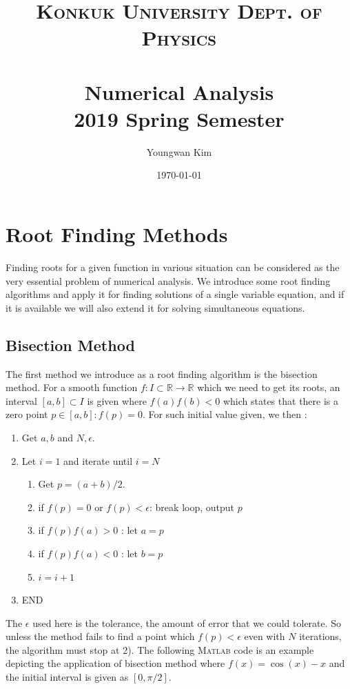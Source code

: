 \documentclass[paper=a4, fontsize=11pt]{scrartcl}
\title{	
	\normalfont \normalsize 
	\textsc{Konkuk University Dept. of Physics} \\ [25pt] %
	\horrule{1pt} \\[0.4cm] 
	\huge Numerical Analysis \\
	\vspace{0.1in}
	\Large 2019 Spring Semester
	\horrule{1pt} \\[0.4cm] 
}
\author{Youngwan Kim}
\date{\normalsize\today}
\newcommand{\MATLAB}{\textsc{Matlab}\xspace}
\begin{document}
	
\maketitle	

\vspace{0.25in}

\section{Root Finding Methods}
\vspace{0.25in}
Finding roots for a given function in various situation can be considered as the very essential problem of numerical analysis. We introduce some root finding algorithms and apply it for finding solutions of a single variable equation, and if it is available we will also extend it for solving simultaneous equations. \\ 

\subsection{Bisection Method}
\vspace{0.15in}
The first method we introduce as a root finding algorithm is the bisection method. For a smooth function $f:I\subset\mathbb{R}\to \mathbb{R}$ which we need to get its roots, an interval $[a,b]\subset I$ is given where $f(a)f(b)<0$ which states that there is a zero point $p\in [a,b] : f(p) =0$. For such initial value given, we then :

\begin{enumerate}[label=\arabic*)]
	\item Get $a,b$ and $N,\epsilon$.
	\item Let $i=1$ and iterate until $i=N$
	\begin{enumerate}[label=(\arabic*)]
		\item Get $p=(a+b)/2$.
		\item if $f(p)=0$ or $f(p)<\epsilon$: break loop, output $p$
		\item if $f(p)f(a) >0$ : let $a=p$
		\item if $f(p)f(a) <0$ : let $b=p$
		\item $i=i+1$
	\end{enumerate}
	\item END \\
\end{enumerate}

The $\epsilon$ used here is the tolerance, the amount of error that we could tolerate. So unless the method fails to find a point which $f(p) < \epsilon$ even with $N$ iterations, the algorithm must stop at 2). The following \MATLAB code is an example depicting the application of bisection method where $f(x)=\cos(x)-x$ and the initial interval is given as $[0,\pi / 2]$.\\
\end{document}

